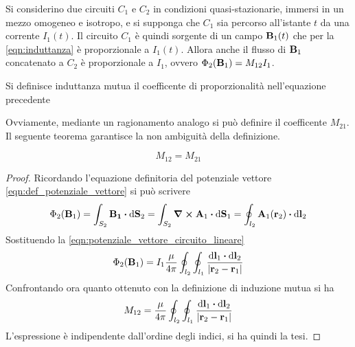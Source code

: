 Si considerino due circuiti $C_1$ e $C_2$ in condizioni quasi-stazionarie, immersi in un mezzo
omogeneo e isotropo,
e si supponga che $C_1$ sia percorso all'istante $t$ da una corrente $I_1(t)$.
Il circuito $C_1$ è quindi sorgente di un campo $\vb{B}_1(t)$ che per la \eqref{eqn:induttanza}
è proporzionale a $I_1(t)$. Allora anche il flusso di $\vb{B}_1$ concatenato a $C_2$
è proporzionale a $I_1$, ovvero $\Phi_2(\vb{B}_1)=M_{12}I_1$.
\begin{defn}
    Si definisce induttanza mutua il coefficente di proporzionalità nell'equazione precedente
\end{defn}
Ovviamente, mediante un ragionamento analogo si può definire il coefficente $M_{21}$.
Il seguente teorema garantisce la non ambiguità della definizione.
\begin{thm}
    \[
        M_{12}=M_{21}
    \]
\end{thm}
\begin{proof}
    Ricordando l'equazione definitoria del potenziale vettore \eqref{eqn:def_potenziale_vettore} si può scrivere
    \[
        \Phi_2(\vb{B}_1)=\int_{S_2}\vb{B_1}\vdot\dd{\vb{S}_2}=\int_{S_2}\curl{\vb{A}_1}\vdot\dd{\vb{S}_1}=\oint_{l_2}\vb{A}_1(\vb{r}_2)\vdot\dd{\vb{l}_2}
    \]
    Sostituendo la \eqref{eqn:potenziale_vettore_circuito_lineare}
    \[
        \Phi_2(\vb{B}_1)=I_1\frac{\mu}{4\pi}\oint_{l_2}\oint_{l_1}\frac{\dd{\vb{l}_1}\vdot\dd{\vb{l}_2}}{\abs{\vb{r}_2-\vb{r}_1}}
    \]
    Confrontando ora quanto ottenuto con la definizione di induzione mutua si ha
    \[
        M_{12}=\frac{\mu}{4\pi}\oint_{l_2}\oint_{l_1}\frac{\dd{\vb{l}_1}\vdot\dd{\vb{l}_2}}{\abs{\vb{r}_2-\vb{r}_1}}
    \]
    L'espressione è indipendente dall'ordine degli indici, si ha quindi la tesi.
\end{proof}
